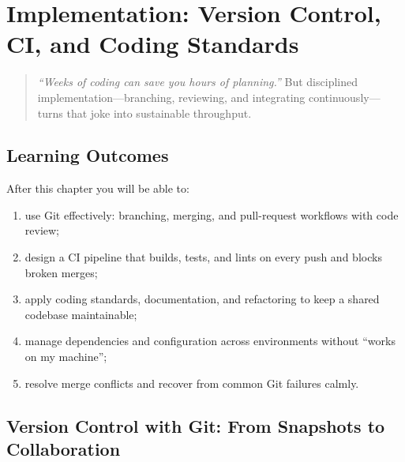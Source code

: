 \chapter{Implementation: Version Control, CI, and Coding Standards}
\label{ch:implementation}

\begin{quote}
\emph{``Weeks of coding can save you hours of planning.''} But disciplined implementation---branching, reviewing, and integrating continuously---turns that joke into sustainable throughput.
\end{quote}

\noindent{}

\vspace{0.4em}

\section*{Learning Outcomes}
After this chapter you will be able to:
\begin{enumerate}[label=(L\arabic*)]
    \item use Git effectively: branching, merging, and pull-request workflows with code review;
    \item design a CI pipeline that builds, tests, and lints on every push and blocks broken merges;
    \item apply coding standards, documentation, and refactoring to keep a shared codebase maintainable;
    \item manage dependencies and configuration across environments without ``works on my machine'';
    \item resolve merge conflicts and recover from common Git failures calmly.
\end{enumerate}

\section{Version Control with Git: From Snapshots to Collaboration}
\label{sec:vcs}

